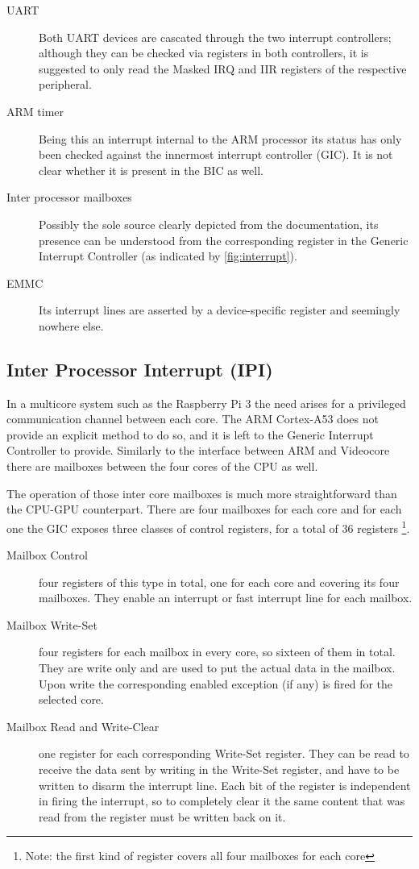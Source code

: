 \documentclass[12pt,a4paper,openright,twoside]{report}
\begin{document}
\begin{description}
    \item[UART] Both UART devices are cascated through the two interrupt controllers;
        although they can be checked via registers in both controllers, it is suggested
        to only read the Masked IRQ and IIR registers of the respective peripheral.
    \item[ARM timer] Being this an interrupt internal to the ARM processor its
        status has only been checked against the innermost interrupt controller (GIC).
        It is not clear whether it is present in the BIC as well.
    \item[Inter processor mailboxes] Possibly the sole source clearly
        depicted from the documentation, its presence can be understood from the 
        corresponding register in the Generic Interrupt Controller (as indicated
        by \ref{fig:interrupt}).
    \item[EMMC] Its interrupt lines are asserted by a device-specific register and
        seemingly nowhere else.
\end{description}

\subsection{Inter Processor Interrupt (IPI)}
In a multicore system such as the Raspberry Pi 3 the need arises for a privileged
communication channel between each core. The ARM Cortex-A53 does not provide an 
explicit method to do so, and it is left to the Generic Interrupt Controller to 
provide.
Similarly to the interface between ARM and Videocore there are mailboxes between
the four cores of the CPU as well.

The operation of those inter core mailboxes is much more straightforward than the
CPU-GPU counterpart. There are four mailboxes for each core and for each one the GIC
exposes three classes of control registers, for a total of 36 registers 
\footnote{Note: the first kind of register covers all four mailboxes for each core}.
\begin{description}
    \item[Mailbox Control] four registers of this type in total, one for each core
        and covering its four mailboxes. They enable an interrupt or fast interrupt
        line for each mailbox.
    \item[Mailbox Write-Set] four registers for each mailbox in every core, so 
        sixteen of them in total. They are write only and are used to put the
        actual data in the mailbox. Upon write the corresponding enabled exception
        (if any) is fired for the selected core.
    \item[Mailbox Read and Write-Clear] one register for each corresponding
        Write-Set register. They can be read to receive the data sent by writing
        in the Write-Set register, and have to be written to disarm the interrupt
        line. Each bit of the register is independent in firing the interrupt, so 
        to completely clear it the same content that was read from the register must
        be written back on it.
\end{description}
\end{document}
